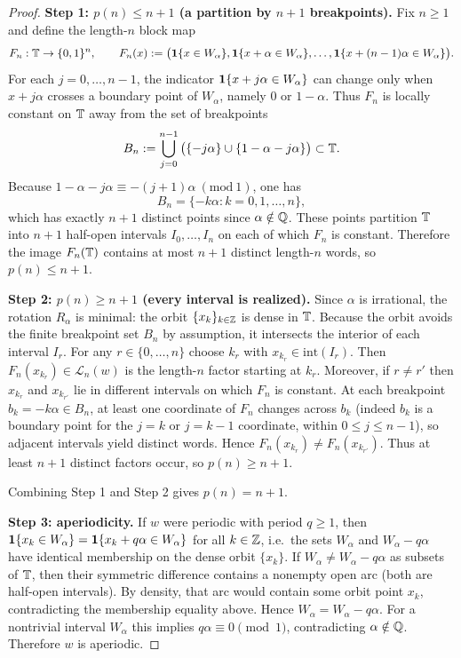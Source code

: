 \begin{proof}
\textbf{Step 1: $p(n)\le n+1$ (a partition by $n{+}1$ breakpoints).}
Fix $n\ge 1$ and define the length-$n$ block map
\[
F_n:\mathbb{T}\to\{0,1\}^n,\qquad
F_n(x):=\big(\mathbf{1}\{x\in W_\alpha\},\mathbf{1}\{x+\alpha\in W_\alpha\},\ldots,
\mathbf{1}\{x+(n-1)\alpha\in W_\alpha\}\big).
\]
For each $j=0,\ldots,n-1$, the indicator $\mathbf{1}\{x+j\alpha\in W_\alpha\}$
can change only when $x+j\alpha$ crosses a boundary point of $W_\alpha$,
namely $0$ or $1-\alpha$.
Thus $F_n$ is locally constant on $\mathbb{T}$ away from the set of breakpoints
\[
B_n:=\bigcup_{j=0}^{n-1}\big(\{-j\alpha\}\cup\{1-\alpha-j\alpha\}\big)
\subset\mathbb{T}.
\]
Because $1-\alpha-j\alpha\equiv -(j+1)\alpha\ (\mathrm{mod}\ 1)$, one has
\[
B_n=\{-k\alpha: k=0,1,\ldots,n\},
\]
which has exactly $n+1$ distinct points since $\alpha\notin\mathbb{Q}$.
These points partition $\mathbb{T}$ into $n+1$ half-open intervals
$I_0,\ldots,I_n$ on each of which $F_n$ is constant.
Therefore the image $F_n(\mathbb{T})$ contains at most $n+1$ distinct length-$n$
words, so $p(n)\le n+1$.

\medskip
\noindent\textbf{Step 2: $p(n)\ge n+1$ (every interval is realized).}
Since $\alpha$ is irrational, the rotation $R_\alpha$ is minimal:
the orbit $\{x_k\}_{k\in\mathbb{Z}}$ is dense in $\mathbb{T}$.
Because the orbit avoids the finite breakpoint set $B_n$ by assumption,
it intersects the interior of each interval $I_r$.
For any $r\in\{0,\ldots,n\}$ choose $k_r$ with $x_{k_r}\in \mathrm{int}(I_r)$.
Then $F_n(x_{k_r})\in\mathcal{L}_n(w)$ is the length-$n$ factor starting at
$k_r$.
Moreover, if $r\neq r'$ then $x_{k_r}$ and $x_{k_{r'}}$ lie in different
intervals on which $F_n$ is constant.
At each breakpoint $b_k=-k\alpha\in B_n$, at least one coordinate of $F_n$
changes across $b_k$ (indeed $b_k$ is a boundary point for the $j=k$ or
$j=k{-}1$ coordinate, within $0\le j\le n{-}1$), so adjacent intervals yield
distinct words.
Hence $F_n(x_{k_r})\neq F_n(x_{k_{r'}})$.
Thus at least $n+1$ distinct factors occur, so $p(n)\ge n+1$.

\medskip
\noindent Combining Step 1 and Step 2 gives $p(n)=n+1$.

\medskip
\noindent\textbf{Step 3: aperiodicity.}
If $w$ were periodic with period $q\ge 1$, then
$\mathbf{1}\{x_k\in W_\alpha\}=\mathbf{1}\{x_k+q\alpha\in W_\alpha\}$ for all $k\in\mathbb{Z}$,
i.e.\ the sets $W_\alpha$ and $W_\alpha-q\alpha$ have identical membership on
the dense orbit $\{x_k\}$.
If $W_\alpha\neq W_\alpha-q\alpha$ as subsets of $\mathbb{T}$, then their symmetric
difference contains a nonempty open arc (both are half-open intervals).
By density, that arc would contain some orbit point $x_k$, contradicting the
membership equality above.
Hence $W_\alpha=W_\alpha-q\alpha$.
For a nontrivial interval $W_\alpha$ this implies $q\alpha\equiv 0\pmod{1}$,
contradicting $\alpha\notin\mathbb{Q}$.
Therefore $w$ is aperiodic.
\end{proof}

